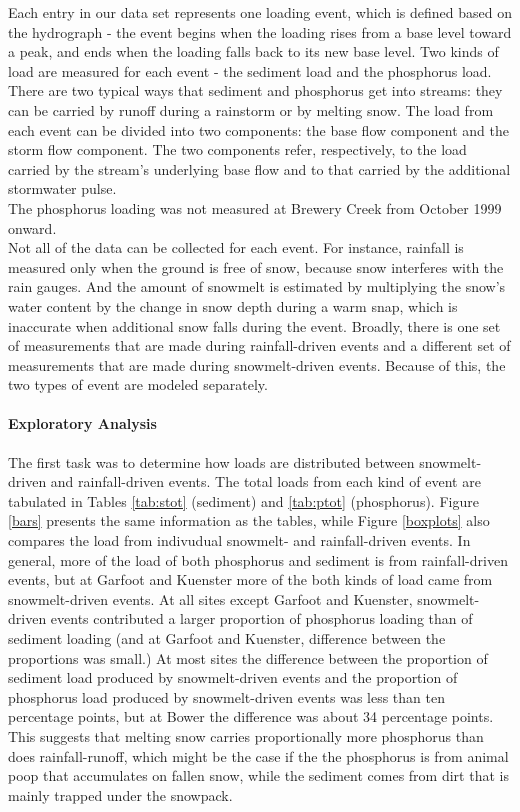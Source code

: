 \documentclass[10pt]{article}
\begin{document}
Each entry in our data set represents one loading event, which is defined based on the hydrograph - the event begins when the loading rises from a base level toward a peak, and ends when the loading falls back to its new base level. Two kinds of load are measured for each event - the sediment load and the phosphorus load. There are two typical ways that sediment and phosphorus get into streams: they can be carried by runoff during a rainstorm or by melting snow. The load from each event can be divided into two components: the base flow component and the storm flow component. The two components refer, respectively, to the load carried by the stream's underlying base flow and to that carried by the additional stormwater pulse.\\

The phosphorus loading was not measured at Brewery Creek from October 1999 onward.\\

Not all of the data can be collected for each event. For instance, rainfall is measured only when the ground is free of snow, because snow interferes with the rain gauges. And the amount of snowmelt is estimated by multiplying the snow's water content by the change in snow depth during a warm snap, which is inaccurate when additional snow falls during the event. Broadly, there is one set of measurements that are made during rainfall-driven events and a different set of measurements that are made during snowmelt-driven events. Because of this, the two types of event are modeled separately.\\

\paragraph{Exploratory Analysis}
The first task was to determine how loads are distributed between snowmelt-driven and rainfall-driven events. The total loads from each kind of event are tabulated in Tables \ref{tab:stot} (sediment) and \ref{tab:ptot} (phosphorus). Figure \ref{bars} presents the same information as the tables, while Figure \ref{boxplots} also compares the load from indivudual snowmelt- and rainfall-driven events. In general, more of the load of both phosphorus and sediment is from rainfall-driven events, but at Garfoot and Kuenster more of the both kinds of load came from snowmelt-driven events. At all sites except Garfoot and Kuenster, snowmelt-driven events contributed a larger proportion of phosphorus loading than of sediment loading (and at Garfoot and Kuenster, difference between the proportions was small.) At most sites the difference between the proportion of sediment load produced by snowmelt-driven events and the proportion of phosphorus load produced by snowmelt-driven events was less than ten percentage points, but at Bower the difference was about 34 percentage points. This suggests that melting snow carries proportionally more phosphorus than does rainfall-runoff, which might be the case if the the phosphorus is from animal poop that accumulates on fallen snow, while the sediment comes from dirt that is mainly trapped under the snowpack.\\
\end{document}
